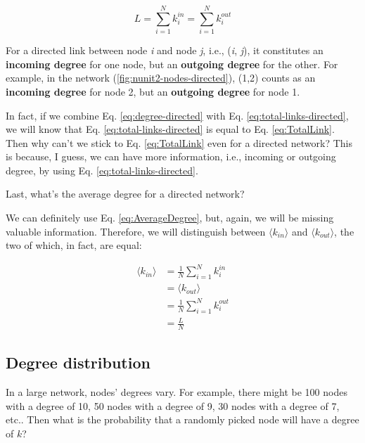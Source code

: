 \documentclass[
]{krantz}
\begin{document}
\begin{equation}
  L = \sum_{i=1}^N k_i^{in} = \sum_{i=1}^N k_i^{out} \label{eq:total-links-directed}
\end{equation}

For a directed link between node \emph{i} and node \emph{j}, i.e., (\emph{i}, \emph{j}), it constitutes an \textbf{incoming degree} for one node, but an \textbf{outgoing degree} for the other. For example, in the network (\ref{fig:nunit2-nodes-directed}), (1,2) counts as an \textbf{incoming degree} for node 2, but an \textbf{outgoing degree} for node 1.

In fact, if we combine Eq. \eqref{eq:degree-directed} with Eq. \eqref{eq:total-links-directed}, we will know that Eq. \eqref{eq:total-links-directed} is equal to Eq. \eqref{eq:TotalLink}. Then why can't we stick to Eq. \eqref{eq:TotalLink} even for a directed network? This is because, I guess, we can have more information, i.e., incoming or outgoing degree, by using Eq. \eqref{eq:total-links-directed}.

Last, what's the average degree for a directed network?

We can definitely use Eq. \eqref{eq:AverageDegree}, but, again, we will be missing valuable information. Therefore, we will distinguish between \(\langle k_{in} \rangle\) and \(\langle k_{out} \rangle\), the two of which, in fact, are equal:

\begin{equation}
\begin{split}
  \langle k_{in} \rangle & = \frac{1}{N}\sum_{i=1}^N k_i^{in}\\
  & = \langle k_{out} \rangle\\
  & = \frac{1}{N}\sum_{i=1}^N k_i^{out}\\
  & = \frac{L}{N} 
\end{split}
\label{eq:average-degree-directed}
\end{equation}

\hypertarget{degree-distribution}{%
\subsection{Degree distribution}\label{degree-distribution}}

In a large network, nodes' degrees vary. For example, there might be 100 nodes with a degree of 10, 50 nodes with a degree of 9, 30 nodes with a degree of 7, etc.. Then what is the probability that a randomly picked node will have a degree of \(k\)?
\end{document}

